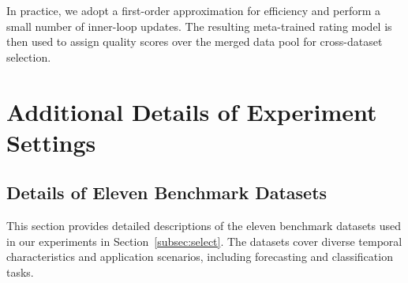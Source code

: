 \documentclass{article}
\begin{document}
In practice, we adopt a first-order approximation for efficiency and perform a small number of inner-loop updates. The resulting meta-trained rating model is then used to assign quality scores over the merged data pool for cross-dataset selection.




\section{Additional Details of Experiment Settings}
\label{appen:expd}

\subsection{Details of Eleven Benchmark Datasets}
\label{subsec:expdata}

This section provides detailed descriptions of the eleven benchmark datasets used in our experiments in Section~\ref{subsec:select}. The datasets cover diverse temporal characteristics and application scenarios, including forecasting and classification tasks.
\end{document}
